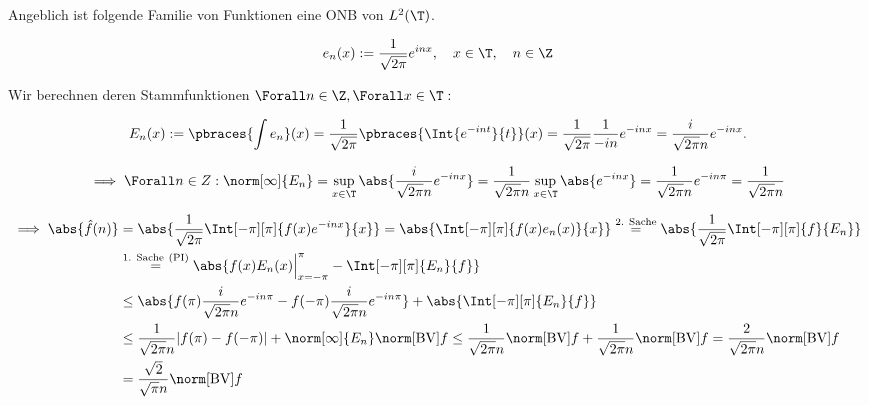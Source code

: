 \begin{solution}
\begin{enumerate}[label = \arabic*.]
\end{enumerate}

Angeblich ist folgende Familie von Funktionen eine ONB von $L^2(\T)$.

\begin{align*}
    e_n(x)
    :=
    \frac{1}{\sqrt{2 \pi}}
    e^{i n x},
    \quad
    x \in \T,
    \quad
    n \in \Z
\end{align*}

Wir berechnen deren Stammfunktionen $\Forall n \in \Z, \Forall x \in \T:$

\begin{align*}
    E_n(x)
    :=
    \pbraces{\int e_n}(x)
    =
    \frac{1}{\sqrt{2 \pi}}
    \pbraces{\Int{e^{-i n t}}{t}}(x)
    =
    \frac{1}{\sqrt{2 \pi}}
    \frac{1}{-i n}
    e^{-i n x}
    =
    \frac{i}{\sqrt{2 \pi} n}
    e^{-i n x}.
\end{align*}

\begin{align*}
    \implies
    \Forall n \in Z:
    \norm[\infty]{E_n}
    =
    \sup_{x \in \T}
    \abs
    {
        \frac{i}{\sqrt{2 \pi} n}
        e^{-i n x}
    }
    =
    \frac{1}{\sqrt{2 \pi} n}
    \sup_{x \in \T}
    \abs{e^{-i n x}}
    =
    \frac{1}{\sqrt{2 \pi} n}    
    e^{-i n \pi}
    =
    \frac{1}{\sqrt{2 \pi} n}
\end{align*}

\begin{align*}
    \implies
    \abs{\hat f(n)}
    & =
    \abs
    {
        \frac{1}{\sqrt{2 \pi}}
        \Int[-\pi][\pi]
        {
            f(x) e^{-i n x}
        }{x}    
    }
    =
    \abs
    {
        \Int[-\pi][\pi]
        {
            f(x) e_n(x)
        }{x}
    }
    \stackrel
    {
        \text{$2$. Sache}
    }{=}
    \abs
    {
        \frac{1}{\sqrt{2 \pi}}
        \Int[-\pi][\pi]{f}{E_n}
    } \\
    & \stackrel
    {
        \text{$1$. Sache}~
        \mathrm{(PI)}
    }{=}
    \abs
    {
        f(x) E_n(x) \Big |_{x = -\pi}^\pi
        -
        \Int[-\pi][\pi]{E_n}{f}
    } \\
    & \leq
    \abs
    {
        f(\pi) \frac{i}{\sqrt{2 \pi} n} e^{-i n \pi}
        -
        f(-\pi) \frac{i}{\sqrt{2 \pi} n} e^{-i n \pi}
    }
    +
    \abs
    {
        \Int[-\pi][\pi]{E_n}{f}
    } \\
    & \leq
    \frac{1}{\sqrt{2 \pi} n} |f(\pi) - f(-\pi)|
    +
    \norm[\infty]{E_n}
    \norm[\mathrm{BV}]{f}
    \leq
    \frac{1}{\sqrt{2 \pi} n}
    \norm[\mathrm{BV}]{f}
    +
    \frac{1}{\sqrt{2 \pi} n}
    \norm[\mathrm{BV}]{f}
    =
    \frac{2}{\sqrt{2 \pi} n}
    \norm[\mathrm{BV}]{f} \\
    & =
    \frac{\sqrt 2}{\sqrt{\pi} n}
    \norm[\mathrm{BV}]{f}    
\end{align*}

\end{solution}

